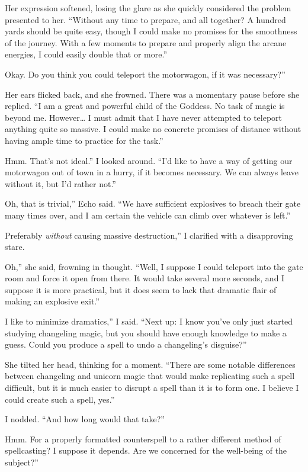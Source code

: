 Her expression softened, losing the glare as she quickly considered the problem presented to her. “Without any time to prepare, and all together? A hundred yards should be quite easy, though I could make no promises for the smoothness of the journey. With a few moments to prepare and properly align the arcane energies, I could easily double that or more.”

\leavevmode{}Okay. Do you think you could teleport the motorwagon, if it was necessary?”

Her ears flicked back, and she frowned. There was a momentary pause before she replied. “I am a great and powerful child of the Goddess. No task of magic is beyond me. However… I must admit that I have never attempted to teleport anything quite so massive. I could make no concrete promises of distance without having ample time to practice for the task.”

\leavevmode{}Hmm. That’s not ideal.” I looked around. “I’d like to have a way of getting our motorwagon out of town in a hurry, if it becomes necessary. We can always leave without it, but I’d rather not.”

\leavevmode{}Oh, that is trivial,” Echo said. “We have sufficient explosives to breach their gate many times over, and I am certain the vehicle can climb over whatever is left.”

\leavevmode{}Preferably \textit{without} causing massive destruction,” I clarified with a disapproving stare.

\leavevmode{}Oh,” she said, frowning in thought. “Well, I suppose I could teleport into the gate room and force it open from there. It would take several more seconds, and I suppose it is more practical, but it does seem to lack that dramatic flair of making an explosive exit.”

\leavevmode{}I like to minimize dramatics,” I said. “Next up: I know you’ve only just started studying changeling magic, but you should have enough knowledge to make a guess. Could you produce a spell to undo a changeling’s disguise?”

She tilted her head, thinking for a moment. “There are some notable differences between changeling and unicorn magic that would make replicating such a spell difficult, but it is much easier to disrupt a spell than it is to form one. I believe I could create such a spell, yes.”

I nodded. “And how long would that take?”

\leavevmode{}Hmm. For a properly formatted counterspell to a rather different method of spellcasting? I suppose it depends. Are we concerned for the well-being of the subject?”


